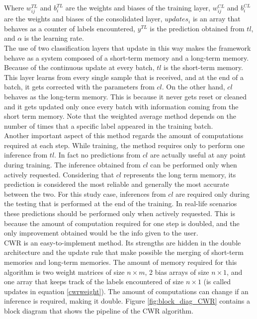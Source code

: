 \documentclass[12pt]{report}
\begin{document}
Where $w^{TL}_{ij}$ and $b^{TL}_i$ are the weights and biases of the training layer, $w^{CL}_{ij}$ and $b^{CL}_i$ are the weights and biases of the consolidated layer, $updates_{i}$ is an array that behaves as a counter of labels encountered, $y^{TL}$ is the prediction obtained from $tl$, and $\alpha$ is the learning rate.\\
The use of two classification layers that update in this way makes the framework behave as a system composed of a short-term memory and a long-term memory. Because of the continuous update at every batch, $tl$ is the short-term memory. This layer learns from every single sample that is received, and at the end of a batch, it gets corrected with the parameters from $cl$. On the other hand, $cl$ behaves as the long-term memory. This is because it never gets reset or cleaned and it gets updated only once every batch with information coming from the short term memory. Note that the weighted average method depends on the number of times that a specific label appeared in the training batch.\\
Another important aspect of this method regards the amount of computations required at each step. While training, the method requires only to perform one inference from $tl$. In fact no predictions from $cl$ are actually useful at any point during training. The inference obtained from $cl$ can be performed only when actively requested. Considering that $cl$ represents the long term memory, its prediction is considered the most reliable and generally the most accurate between the two. For this study case, inferences from $cl$ are required only during the testing that is performed at the end of the training. In real-life scenarios these predictions should be performed only when actively requested. This is because the amount of computation required for one step is doubled, and the only improvement obtained would be the info given to the user.\\
CWR is an easy-to-implement method. Its strengths are hidden in the double architecture and the update rule that make possible the merging of short-term memories and long-term memories. The amount of memory required for this algorithm is two weight matrices of size $n \times m$, 2 bias arrays of size $n \times 1$, and one array that keeps track of the labels encountered of size $n \times 1$ (is called updates in equation \ref{cwrweight}). The amount of computations can change if an inference is required, making it double. Figure \ref{fig:block_diag_CWR} contains a block diagram that shows the pipeline of the CWR algorithm.
\end{document}
